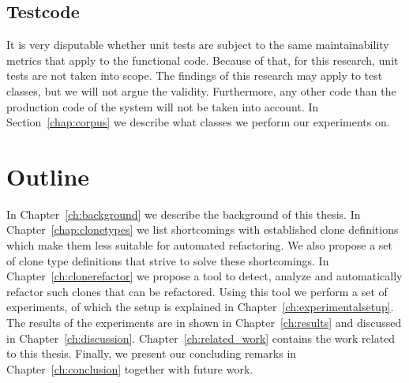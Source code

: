 \subsection{Testcode}
It is very disputable whether unit tests are subject to the same maintainability metrics that apply to the functional code. Because of that, for this research, unit tests are not taken into scope. The findings of this research may apply to test classes, but we will not argue the validity. Furthermore, any other code than the production code of the system will not be taken into account. In Section~\ref{chap:corpus} we describe what classes we perform our experiments on.

\section{Outline}
In Chapter~\ref{ch:background} we describe the background of this thesis. In Chapter~\ref{chap:clonetypes} we list shortcomings with established clone definitions which make them less suitable for automated refactoring. We also propose a set of clone type definitions that strive to solve these shortcomings. In Chapter~\ref{ch:clonerefactor} we propose a tool to detect, analyze and automatically refactor such clones that can be refactored. Using this tool we perform a set of experiments, of which the setup is explained in Chapter~\ref{ch:experimentalsetup}. The results of the experiments are in shown in Chapter~\ref{ch:results} and discussed in Chapter~\ref{ch:discussion}. Chapter~\ref{ch:related_work} contains the work related to this thesis. Finally, we present our concluding remarks in Chapter~\ref{ch:conclusion} together with future work.
